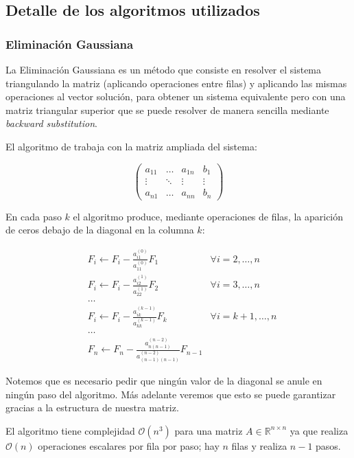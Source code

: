 \subsection{Detalle de los algoritmos utilizados}
\subsubsection{Eliminación Gaussiana}
La Eliminación Gaussiana es un método que consiste en resolver el sistema triangulando la matriz (aplicando operaciones entre filas) y aplicando las mismas operaciones al vector solución, para obtener un sistema equivalente pero con una matriz triangular superior que se puede resolver de manera sencilla mediante \emph{backward substitution}.

El algoritmo de trabaja con la matriz ampliada del sistema:

\[\left(\begin{array}{ccc|c}
a_{11} & \ldots & a_{1n} & b_1\\
\vdots & \ddots & \vdots & \vdots\\
a_{n1} & \ldots & a_{nn} & b_n
\end{array}\right)\]

En cada paso $k$ el algoritmo produce, mediante operaciones de filas, la aparición de ceros debajo de la diagonal en la columna $k$:

\begin{align*}
&F_i \leftarrow F_i - \frac{a_{i1}^{(0)}}{a_{11}^{(0)}}F_1 &\forall i = 2, \ldots, n \\
&F_i \leftarrow F_i - \frac{a_{i2}^{(1)}}{a_{22}^{(1)}}F_2 &\forall i = 3, \ldots, n \\
&\ldots \\
&F_i \leftarrow F_i - \frac{a_{ik}^{(k - 1)}}{a_{kk}^{(k - 1)}}F_k &\forall i = k + 1, \ldots, n \\
&\ldots \\
&F_n \leftarrow F_n - \frac{a_{n(n-1)}^{(n-2)}}{a_{(n-1)(n-1)}^{(n-2)}}F_{n - 1} &
\end{align*}

Notemos que es necesario pedir que ningún valor de la diagonal se anule en ningún paso del algoritmo. Más adelante veremos que esto se puede garantizar gracias a la estructura de nuestra matriz.

El algoritmo tiene complejidad $\mathcal{O}(n^3)$ para una matriz $A \in \mathbb{R}^{n \times n}$ ya que realiza $\mathcal{O}(n)$ operaciones escalares por fila por paso; hay $n$ filas y realiza $n-1$ pasos.

